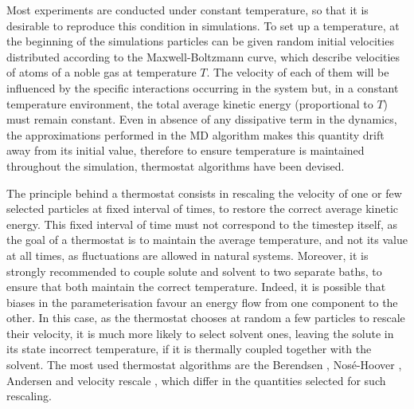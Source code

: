 Most experiments are conducted under constant temperature, so that it is desirable to reproduce this condition in simulations.
%
To set up a temperature, at the beginning of the simulations particles can be given random initial velocities distributed according to the Maxwell-Boltzmann curve, which describe velocities of atoms of a noble gas at temperature $T$. The velocity of each of them will be influenced by the specific interactions occurring in the system but, in a constant temperature environment, the total average kinetic energy (proportional to $T$) must remain constant.
%
Even in absence of any dissipative term in the dynamics, the approximations performed in the MD algorithm makes this quantity drift away from its initial value, therefore to ensure temperature is maintained throughout the simulation, thermostat algorithms have been devised.

The principle behind a thermostat consists in rescaling the velocity of one or few selected particles at fixed interval of times, to restore the correct average kinetic energy. This fixed interval of time must not correspond to the timestep itself, as the goal of a thermostat is to maintain the average temperature, and not its value at all times, as fluctuations are allowed in natural systems.
%
Moreover, it is strongly recommended to couple solute and solvent to two separate baths, to ensure that both maintain the correct temperature. Indeed, it is possible that biases in the parameterisation favour an energy flow from one component to the other. In this case, as the thermostat chooses at random a few particles to rescale their velocity, it is much more likely to select solvent ones, leaving the solute in its state incorrect temperature, if it is thermally coupled together with the solvent.
%
The most used thermostat algorithms are the Berendsen \cite{Berendsen1984}, Nos\'{e}-Hoover \cite{Nose1983,Hoover1985}, Andersen \cite{Andersen1980} and velocity rescale \cite{Bussi2007}, which differ in the quantities selected for such rescaling.

